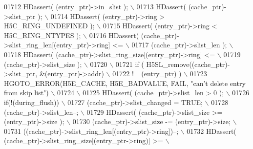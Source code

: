 \begin{DoxyCode}
01712 \textcolor{preprocessor}{    HDassert( (entry\_ptr)->in\_slist );                                      \(\backslash\)}
01713 \textcolor{preprocessor}{    HDassert( (cache\_ptr)->slist\_ptr );                                     \(\backslash\)}
01714 \textcolor{preprocessor}{    HDassert( (entry\_ptr)->ring > H5C\_RING\_UNDEFINED );                     \(\backslash\)}
01715 \textcolor{preprocessor}{    HDassert( (entry\_ptr)->ring < H5C\_RING\_NTYPES );                        \(\backslash\)}
01716 \textcolor{preprocessor}{    HDassert( (cache\_ptr)->slist\_ring\_len[(entry\_ptr)->ring] <=             \(\backslash\)}
01717 \textcolor{preprocessor}{              (cache\_ptr)->slist\_len );                                     \(\backslash\)}
01718 \textcolor{preprocessor}{    HDassert( (cache\_ptr)->slist\_ring\_size[(entry\_ptr)->ring] <=            \(\backslash\)}
01719 \textcolor{preprocessor}{              (cache\_ptr)->slist\_size );                                    \(\backslash\)}
01720 \textcolor{preprocessor}{                                                                            \(\backslash\)}
01721 \textcolor{preprocessor}{    if ( H5SL\_remove((cache\_ptr)->slist\_ptr, &(entry\_ptr)->addr)            \(\backslash\)}
01722 \textcolor{preprocessor}{             != (entry\_ptr) )                                               \(\backslash\)}
01723 \textcolor{preprocessor}{        HGOTO\_ERROR(H5E\_CACHE, H5E\_BADVALUE, FAIL, "can't delete entry from skip list") \(\backslash\)}
01724 \textcolor{preprocessor}{                                                                            \(\backslash\)}
01725 \textcolor{preprocessor}{    HDassert( (cache\_ptr)->slist\_len > 0 );                                 \(\backslash\)}
01726 \textcolor{preprocessor}{    if(!(during\_flush))                                                     \(\backslash\)}
01727 \textcolor{preprocessor}{        (cache\_ptr)->slist\_changed = TRUE;                                  \(\backslash\)}
01728 \textcolor{preprocessor}{    (cache\_ptr)->slist\_len--;                                               \(\backslash\)}
01729 \textcolor{preprocessor}{    HDassert( (cache\_ptr)->slist\_size >= (entry\_ptr)->size );               \(\backslash\)}
01730 \textcolor{preprocessor}{    (cache\_ptr)->slist\_size -= (entry\_ptr)->size;                           \(\backslash\)}
01731 \textcolor{preprocessor}{    ((cache\_ptr)->slist\_ring\_len[(entry\_ptr)->ring])--;                     \(\backslash\)}
01732 \textcolor{preprocessor}{    HDassert( (cache\_ptr)->slist\_ring\_size[(entry\_ptr->ring)] >=            \(\backslash\)}

\end{DoxyCode}

